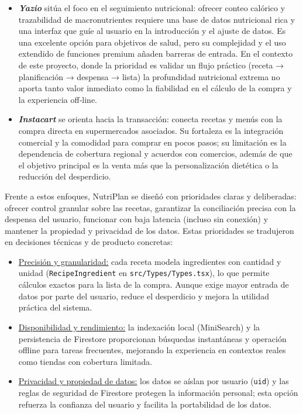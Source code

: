 \documentclass[twoside, openright, 11pt]{report}
\begin{document}
\begin{enumerate}
\begin{itemize}
			\item \textit{\textbf{Yazio}} sitúa el foco en el seguimiento nutricional: ofrecer conteo calórico y trazabilidad de macronutrientes requiere una base de datos nutricional rica y una interfaz que guíe al usuario en la introducción y el ajuste de datos. Es una excelente opción para objetivos de salud, pero su complejidad y el uso extendido de funciones premium añaden barreras de entrada. En el contexto de este proyecto, donde la prioridad es validar un flujo práctico (receta → planificación → despensa → lista) la profundidad nutricional extrema no aporta tanto valor inmediato como la fiabilidad en el cálculo de la compra y la experiencia off‑line.
			\item \textit{\textbf{Instacart}} se orienta hacia la transacción: conecta recetas y menús con la compra directa en supermercados asociados. Su fortaleza es la integración comercial y la comodidad para comprar en pocos pasos; su limitación es la dependencia de cobertura regional y acuerdos con comercios, además de que el objetivo principal es la venta más que la personalización dietética o la reducción del desperdicio.
		\end{itemize}
		  
		Frente a estos enfoques, NutriPlan se diseñó con prioridades claras y deliberadas: ofrecer control granular sobre las recetas, garantizar la conciliación precisa con la despensa del usuario, funcionar con baja latencia (incluso sin conexión) y mantener la propiedad y privacidad de los datos. Estas prioridades se tradujeron en decisiones técnicas y de producto concretas:
		
		\begin{itemize}
			\item \underline{Precisión y granularidad:} cada receta modela ingredientes con cantidad y unidad (\texttt{RecipeIngredient} en \texttt{src/Types/Types.tsx}), lo que permite cálculos exactos para la lista de la compra. Aunque exige mayor entrada de datos por parte del usuario, reduce el desperdicio y mejora la utilidad práctica del sistema.
			
			\item \underline{Disponibilidad y rendimiento:} la indexación local (MiniSearch) y la persistencia de Firestore proporcionan búsquedas instantáneas y operación offline para tareas frecuentes, mejorando la experiencia en contextos reales como tiendas con cobertura limitada.
			
			\item \underline{Privacidad y propiedad de datos:} los datos se aíslan por usuario (\texttt{uid}) y las reglas de seguridad de Firestore protegen la información personal; esta opción refuerza la confianza del usuario y facilita la portabilidad de los datos.
			

\end{itemize}
\end{enumerate}
\end{document}
